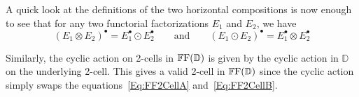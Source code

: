 A quick look at the definitions of the two horizontal compositions is now enough to see that for any two functorial factorizations $E_1$ and $E_2$, we have
\[
	(E_1\otimes E_2)^{\bullet} = E_1^{\bullet}\odot E_2^{\bullet}
	\qquad\text{and}\qquad
	(E_1\odot E_2)^{\bullet} = E_1^{\bullet}\otimes E_2^{\bullet}
\]

Similarly, the cyclic action on 2-cells in $\mathbb{F}\mathrm{F}(\mathbb{D})$ is given by the cyclic action in $\mathbb{D}$ on the underlying 2-cell. This gives a valid 2-cell in $\mathbb{F}\mathrm{F}(\mathbb{D})$ since the cyclic action simply swaps the equations~\eqref{Eq:FF2CellA} and~\eqref{Eq:FF2CellB}.

